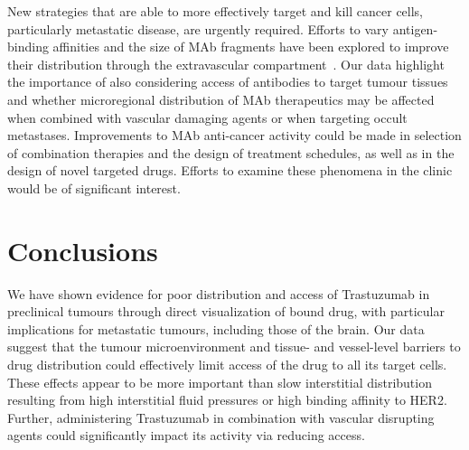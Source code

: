 
New strategies that are able to more effectively target and kill cancer cells, particularly metastatic disease, are urgently required.
Efforts to vary antigen-binding affinities and the size of \acs{MAb} fragments have been explored to improve their distribution through the extravascular compartment~\cite{Jain:2010ie,Chauhan:2011fi}.
Our data highlight the importance of also considering access of antibodies to target tumour tissues and whether microregional distribution of \acs{MAb} therapeutics may be affected when combined with vascular damaging agents or when targeting occult metastases.
Improvements to \acs{MAb} anti-cancer activity could be made in selection of combination therapies and the design of treatment schedules, as well as in the design of novel targeted drugs.
Efforts to examine these phenomena in the clinic would be of significant interest.

\section{Conclusions}
We have shown evidence for poor distribution and access of Trastuzumab in preclinical tumours through direct visualization of bound drug, with particular implications for metastatic tumours, including those of the brain.
Our data suggest that the tumour microenvironment and tissue- and vessel-level barriers to drug distribution could effectively limit access of the drug to all its target cells.
These effects appear to be more important than slow interstitial distribution resulting from high interstitial fluid pressures or high binding affinity to \acs{HER2}.
Further, administering Trastuzumab in combination with vascular disrupting agents could significantly impact its activity via reducing access.


\endinput